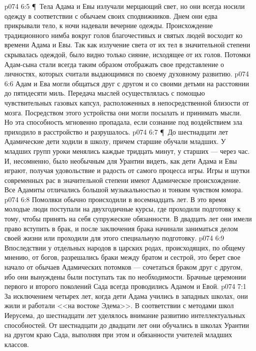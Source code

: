 \vs p074 6:5 \P\ Тела Адама и Евы излучали мерцающий свет, но они всегда носили одежду в соответствии с обычаем своих сподвижников. Днем они едва прикрывали тело, к ночи надевали вечерние одежды. Происхождение традиционного нимба вокруг голов благочестивых и святых людей восходит ко времени Адама и Евы. Так как излучение света от их тел в значительной степени скрывалась одеждой, было видно только сияние, исходящее от их голов. Потомки Адам\hyp{}сына стали всегда таким образом отображать свое представление о личностях, которых считали выдающимися по своему духовному развитию.
\vs p074 6:6 Адам и Ева могли общаться друг с другом и со своими детьми на расстоянии до пятидесяти миль. Передача мыслей осуществлялась с помощью чувствительных газовых капсул, расположенных в непосредственной близости от мозга. Посредством этого устройства они могли посылать и принимать мысли. Но эта способность мгновенно пропадала, если сознание под воздействием зла приходило в расстройство и разрушалось.
\vs p074 6:7 \P\ До шестнадцати лет Адамические дети ходили в школу, причем старшие обучали младших. У младших групп уроки менялись каждые тридцать минут, у старших --- через час. И, несомненно, было необычным для Урантии видеть, как дети Адама и Евы играют, получая удовольствие и радость от самого процесса игры. Игры и шутки современных рас в значительной степени имеют Адамическое происхождение. Все Адамиты отличались большой музыкальностью и тонким чувством юмора.
\vs p074 6:8 Помолвки обычно происходили в восемнадцать лет. В это время молодые люди поступали на двухгодичные курсы, где проходили подготовку к тому, чтобы принять на себя супружеские обязанности. В двадцать лет они имели право вступить в брак, и после заключения брака начинали заниматься делом своей жизни или проходили для этого специальную подготовку.
\vs p074 6:9 Впоследствии у отдельных народов в царских родах, происходящих, по общему мнению, от богов, разрешались браки между братом и сестрой, это берет свое начало от обычаев Адамических потомков --- сочетаться браком друг с другом, ибо они вынуждены были поступать так по необходимости. Брачные церемонии первого и второго поколений Сада всегда проводились Адамом и Евой.
\vs p074 7:1 За исключением четырех лет, когда дети Адама учились в западных школах, они жили и работали <<на востоке Эдема>>. В соответствии с методами школ Иерусема, до шестнадцати лет уделялось внимание развитию интеллектуальных способностей. От шестнадцати до двадцати лет они обучались в школах Урантии на другом краю Сада, выполняя при этом и обязанности учителей младших классов.
